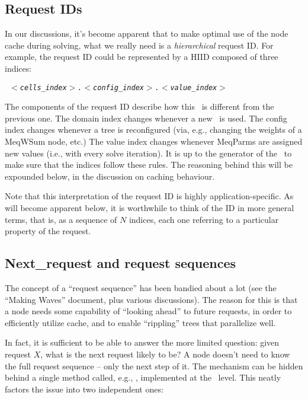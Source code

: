 \documentclass[10pt]{article}
\begin{document}
\subsection{Request IDs}

  In our discussions, it's become apparent that to make optimal use of the node
  cache during solving, what we really need is a {\em hierarchical} request ID.
  For example, the request ID could be represented by a HIID composed of three
  indices:

  {\tt\em  
  $<$cells\_index$>$.$<$config\_index$>$.$<$value\_index$>$
  }
  
  The components of the request ID describe how this \Request\ is different
  from the previous one. The domain index changes whenever a new \Cells\ is
  used. The config index changes whenever a tree is reconfigured (via, e.g.,
  changing the weights of a MeqWSum node, etc.) The value index changes
  whenever MeqParms are assigned new values (i.e., with every solve iteration).
  It is up to the generator of the \Request\ to make sure that the indices
  follow these rules. The reasoning behind this will be expounded below, in the
  discussion on caching behaviour.

  Note that this interpretation of the request ID is highly
  application-specific. As will become apparent below, it is worthwhile to
  think of the ID in more general terms, that is, as a sequence of $N$ indices,
  each one referring to a particular property of the request. 

\subsection{Next\_request and request sequences}

  The concept of a ``request sequence'' has been bandied about a lot (see the
  ``Making Waves'' document, plus various discussions). The reason for this is
  that a node needs some capability of ``looking ahead'' to future requests, in
  order to efficiently utilize cache, and to enable ``rippling'' trees that
  parallelize well.

  In fact, it is sufficient to be able to answer the more limited question:
  given request $X$, what is the next request likely to be? A node doesn't 
  need to know the full request sequence -- only the next step of it. The
  mechanism can be hidden behind a single method called, e.g.,
  , implemented at the \Node\ level. This neatly
  factors the issue into two independent ones:
\end{document}
